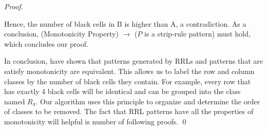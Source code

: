 \begin{proof}
\begin{itemize}
Hence, the number of black cells in B is higher than A, a contradiction. As a conclusion, (Monotonicity Property) $\rightarrow$ ($P$ is a strip-rule pattern) must hold, which concludes our proof.
\end{itemize}

In conclusion,  have shown that patterns generated by RRLs and patterns
that are satisfy monotonicity are equivalent.
This allows us to label the row and column classes by the number of black
cells they contain.
For example, every row that has exactly 4 black cells will be identical and
can be grouped into the class named $R_4$.
Our algorithm uses this principle to organize and determine the order of
classes to be removed.
The fact that RRL patterns have all the properties of monotonicity will
helpful is number of following proofs.
\qed
\end{proof}
